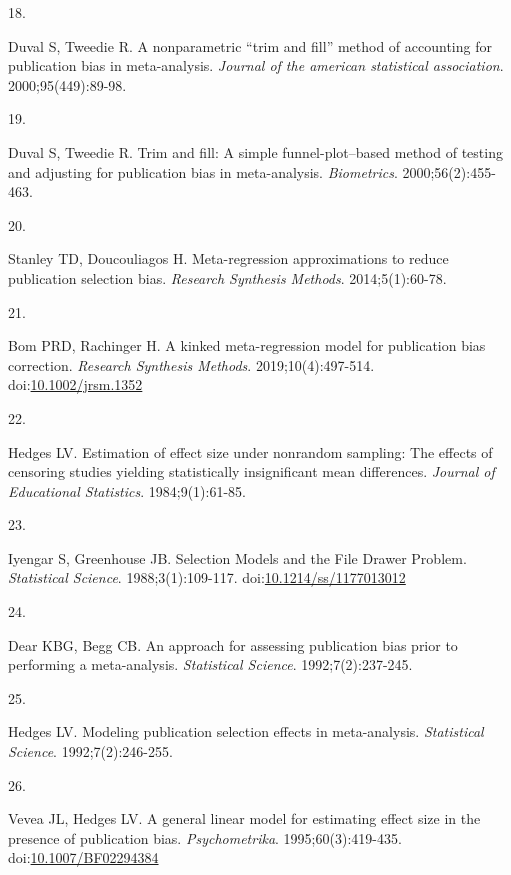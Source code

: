 \documentclass[
  american,
  man, donotrepeattitle,floatsintext]{apa7}
\newlength{\cslhangindent}
\newlength{\csllabelwidth}
\newenvironment{CSLReferences}[2] %
 {\begin{list}{}{%
  \setlength{\itemindent}{0pt}
  \setlength{\leftmargin}{0pt}
  \setlength{\parsep}{0pt}
  \ifodd #1
   \setlength{\leftmargin}{\cslhangindent}
   \setlength{\itemindent}{-1\cslhangindent}
  \fi
  \setlength{\itemsep}{#2\baselineskip}}}
 {\end{list}}
\newcommand{\CSLLeftMargin}[1]{\parbox[t]{\csllabelwidth}{\strut#1\strut}}
\newcommand{\CSLRightInline}[1]{\parbox[t]{\linewidth - \csllabelwidth}{\strut#1\strut}}
\begin{document}
\begin{CSLReferences}{0}{1}
\CSLLeftMargin{18. }%
\CSLRightInline{Duval S, Tweedie R. A nonparametric {``trim and fill''} method of accounting for publication bias in meta-analysis. \emph{Journal of the american statistical association}. 2000;95(449):89-98.}

\CSLLeftMargin{19. }%
\CSLRightInline{Duval S, Tweedie R. Trim and fill: A simple funnel-plot--based method of testing and adjusting for publication bias in meta-analysis. \emph{Biometrics}. 2000;56(2):455-463.}

\CSLLeftMargin{20. }%
\CSLRightInline{Stanley TD, Doucouliagos H. Meta-regression approximations to reduce publication selection bias. \emph{Research Synthesis Methods}. 2014;5(1):60-78.}

\CSLLeftMargin{21. }%
\CSLRightInline{Bom PRD, Rachinger H. A kinked meta-regression model for publication bias correction. \emph{Research Synthesis Methods}. 2019;10(4):497-514. doi:\href{https://doi.org/10.1002/jrsm.1352}{10.1002/jrsm.1352}}

\CSLLeftMargin{22. }%
\CSLRightInline{Hedges LV. Estimation of effect size under nonrandom sampling: The effects of censoring studies yielding statistically insignificant mean differences. \emph{Journal of Educational Statistics}. 1984;9(1):61-85.}

\CSLLeftMargin{23. }%
\CSLRightInline{Iyengar S, Greenhouse JB. Selection {Models} and the {File} {Drawer} {Problem}. \emph{Statistical Science}. 1988;3(1):109-117. doi:\href{https://doi.org/10.1214/ss/1177013012}{10.1214/ss/1177013012}}

\CSLLeftMargin{24. }%
\CSLRightInline{Dear KBG, Begg CB. {An approach for assessing publication bias prior to performing a meta-analysis}. \emph{Statistical Science}. 1992;7(2):237-245.}

\CSLLeftMargin{25. }%
\CSLRightInline{Hedges LV. Modeling publication selection effects in meta-analysis. \emph{Statistical Science}. 1992;7(2):246-255.}

\CSLLeftMargin{26. }%
\CSLRightInline{Vevea JL, Hedges LV. A general linear model for estimating effect size in the presence of publication bias. \emph{Psychometrika}. 1995;60(3):419-435. doi:\href{https://doi.org/10.1007/BF02294384}{10.1007/BF02294384}}


\end{CSLReferences}
\end{document}

